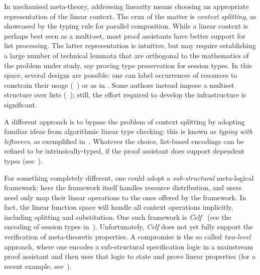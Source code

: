 
In mechanised meta-theory, addressing linearity means choosing an
appropriate representation of the linear context. The crux of the matter
is \emph{context splitting}, as showcased by the typing rule for parallel composition.
While a linear context is perhaps best seen as a multi-set, most proof
assistants have better support for list processing.  The
latter representation is intuitive, but may require establishing a 
large number of technical lemmata that are
orthogonal to the mathematics of the problem under study, say proving
type preservation for session types. In this space, several designs
are possible: one can label occurrences of resources to constrain
their usage (\eg~\cite{CicconeP20}) or  as in \cite{Castro2020}. Some authors instead impose a
multiset structure over lists (\eg~\cite{ChaudhuriLR19,Danielsson12});
still, the effort required to develop the infrastructure is significant.

A different approach is to bypass the problem of context splitting by
adopting
familiar ideas from algorithmic linear type checking: this is known as
 \emph{typing with leftovers}, as exemplified
in~\cite{DBLP:conf/forte/ZalakainD21}. Whatever the choice, list-based
encodings can be refined to be intrinsically-typed, if the proof
assistant does support dependent types (see~\cite{Thiemann2019,CicconeP20,RouvoetPKV20}).

For something completely different, one could adopt a
\emph{sub-structural} meta-logical framework: here the framework
itself handles resource distribution, and users need only map
their linear operations to the ones offered by the framework. In fact,
the linear function space will handle all context operations
implicitly, including splitting and substitution. One such framework
is \emph{Celf}~\cite{Schack-Nielsen:IJCAR08} (see the encoding of
session types in~\cite{Bock2016}). Unfortunately, \emph{Celf} does not
yet fully support the verification of meta-theoretic properties. A compromise is the so called
\emph{two-level} approach, where one encodes a sub-structural
specification logic in a mainstream proof assistant and then uses that
logic to state and prove linear properties (for a recent
example, see~\cite{Felty:MSCS21}).



